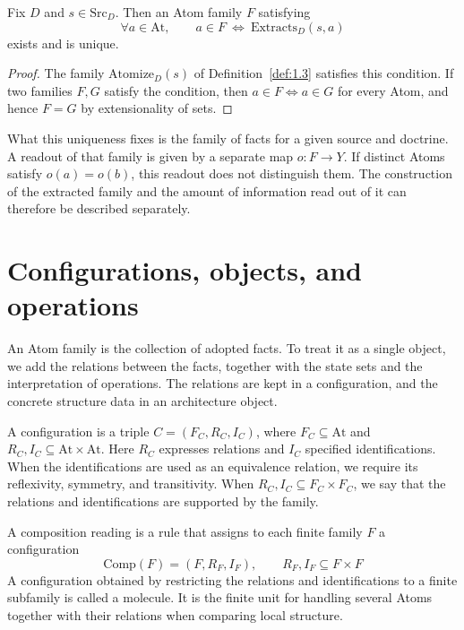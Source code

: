 \begin{proposition}\label{prop:1.4}

Fix $D$ and $s\in\mathrm{Src}_D$. Then an Atom family $F$ satisfying
\[
\forall a\in\mathrm{At},\qquad
a\in F\ \Longleftrightarrow\ \mathrm{Extracts}_D(s,a)
\]
exists and is unique.

\end{proposition}

\begin{proof}

The family $\mathrm{Atomize}_D(s)$ of Definition~\ref{def:1.3} satisfies this
condition. If two families $F,G$ satisfy the condition, then
$a\in F\Longleftrightarrow a\in G$ for every Atom, and hence $F=G$ by
extensionality of sets.

\end{proof}

What this uniqueness fixes is the family of facts for a given source and doctrine.
A readout of that family is given by a separate map $o:F\to Y$.
If distinct Atoms satisfy $o(a)=o(b)$, this readout does not distinguish them.
The construction of the extracted family and the amount of information read out of
it can therefore be described separately.

\section{Configurations, objects, and operations}\label{sec:1.2}

An Atom family is the collection of adopted facts. To treat it as a single object,
we add the relations between the facts, together with the state sets and the
interpretation of operations. The relations are kept in a configuration, and the concrete structure
data in an architecture object.

\begin{definition}[Configuration]\label{def:1.5}

A configuration is a triple $C=(F_C,R_C,I_C)$, where $F_C\subseteq\mathrm{At}$
and $R_C,I_C\subseteq\mathrm{At}\times\mathrm{At}$.
Here $R_C$ expresses relations and $I_C$ specified identifications.
When the identifications are used as an equivalence relation, we require its
reflexivity, symmetry, and transitivity.
When $R_C,I_C\subseteq F_C\times F_C$, we say that the relations and
identifications are supported by the family.

A composition reading is a rule that assigns to each finite family $F$ a
configuration
\[
\mathrm{Comp}(F)=(F,R_F,I_F),
\qquad R_F,I_F\subseteq F\times F
\]
A configuration obtained by restricting the relations and identifications to a
finite subfamily is called a molecule. It is the finite unit for handling several
Atoms together with their relations when comparing local structure.

\end{definition}

